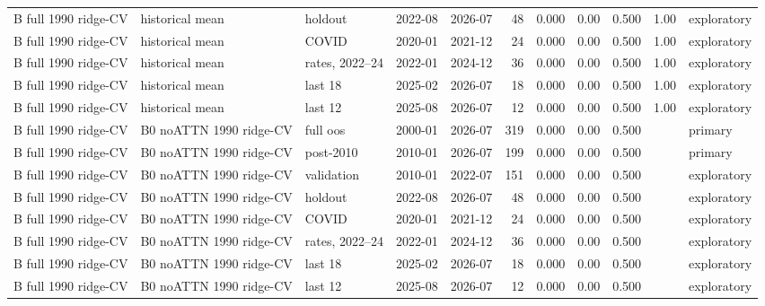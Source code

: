 \begin{table}[H]
\begin{adjustbox}{max width=\linewidth}
\begin{tabular}{lllllrlllll}
B full 1990 ridge-CV & historical mean & holdout & 2022-08 & 2026-07 & 48 & 0.000 & 0.00 & 0.500 & 1.00 & exploratory \\
B full 1990 ridge-CV & historical mean & COVID & 2020-01 & 2021-12 & 24 & 0.000 & 0.00 & 0.500 & 1.00 & exploratory \\
B full 1990 ridge-CV & historical mean & rates, 2022--24 & 2022-01 & 2024-12 & 36 & 0.000 & 0.00 & 0.500 & 1.00 & exploratory \\
B full 1990 ridge-CV & historical mean & last 18 & 2025-02 & 2026-07 & 18 & 0.000 & 0.00 & 0.500 & 1.00 & exploratory \\
B full 1990 ridge-CV & historical mean & last 12 & 2025-08 & 2026-07 & 12 & 0.000 & 0.00 & 0.500 & 1.00 & exploratory \\
B full 1990 ridge-CV & B0 noATTN 1990 ridge-CV & full oos & 2000-01 & 2026-07 & 319 & 0.000 & 0.00 & 0.500 &  & primary \\
B full 1990 ridge-CV & B0 noATTN 1990 ridge-CV & post-2010 & 2010-01 & 2026-07 & 199 & 0.000 & 0.00 & 0.500 &  & primary \\
B full 1990 ridge-CV & B0 noATTN 1990 ridge-CV & validation & 2010-01 & 2022-07 & 151 & 0.000 & 0.00 & 0.500 &  & exploratory \\
B full 1990 ridge-CV & B0 noATTN 1990 ridge-CV & holdout & 2022-08 & 2026-07 & 48 & 0.000 & 0.00 & 0.500 &  & exploratory \\
B full 1990 ridge-CV & B0 noATTN 1990 ridge-CV & COVID & 2020-01 & 2021-12 & 24 & 0.000 & 0.00 & 0.500 &  & exploratory \\
B full 1990 ridge-CV & B0 noATTN 1990 ridge-CV & rates, 2022--24 & 2022-01 & 2024-12 & 36 & 0.000 & 0.00 & 0.500 &  & exploratory \\
B full 1990 ridge-CV & B0 noATTN 1990 ridge-CV & last 18 & 2025-02 & 2026-07 & 18 & 0.000 & 0.00 & 0.500 &  & exploratory \\
B full 1990 ridge-CV & B0 noATTN 1990 ridge-CV & last 12 & 2025-08 & 2026-07 & 12 & 0.000 & 0.00 & 0.500 &  & exploratory \\
\bottomrule
\end{tabular}
\end{adjustbox}
\end{table}
